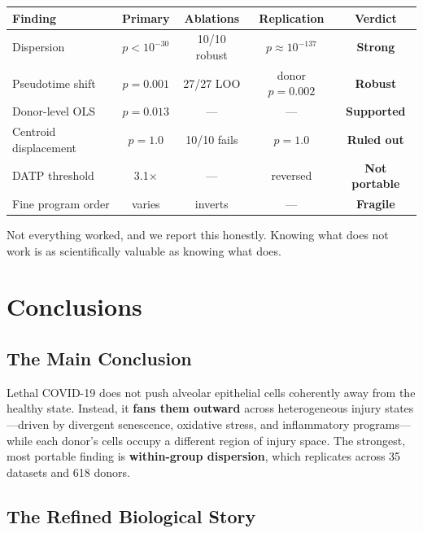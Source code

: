 \documentclass[11pt]{article}
\begin{document}
\begin{center}
\small
\begin{tabular}{lcccc}
\toprule
Finding & Primary & Ablations & Replication & Verdict \\
\midrule
Dispersion & $p < 10^{-30}$ & 10/10 robust & $p \approx 10^{-137}$ & \textbf{Strong} \\
Pseudotime shift & $p = 0.001$ & 27/27 LOO & donor $p = 0.002$ & \textbf{Robust} \\
Donor-level OLS & $p = 0.013$ & --- & --- & \textbf{Supported} \\
Centroid displacement & $p = 1.0$ & 10/10 fails & $p = 1.0$ & \textbf{Ruled out} \\
DATP threshold & 3.1$\times$ & --- & reversed & \textbf{Not portable} \\
Fine program order & varies & inverts & --- & \textbf{Fragile} \\
\bottomrule
\end{tabular}
\end{center}

Not everything worked, and we report this honestly. Knowing what does not work is as scientifically valuable as knowing what does.


\section{Conclusions}

\subsection{The Main Conclusion}

Lethal COVID-19 does not push alveolar epithelial cells coherently away from the healthy state. Instead, it \textbf{fans them outward} across heterogeneous injury states---driven by divergent senescence, oxidative stress, and inflammatory programs---while each donor's cells occupy a different region of injury space. The strongest, most portable finding is \textbf{within-group dispersion}, which replicates across 35 datasets and 618 donors.

\subsection{The Refined Biological Story}
\end{document}
